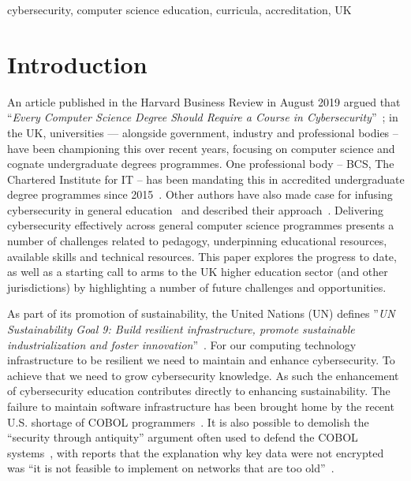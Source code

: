 \documentclass[conference]{IEEEtran}
\begin{document}
\begin{IEEEkeywords}
cybersecurity, computer science education, curricula, accreditation, UK
\end{IEEEkeywords}

\section{Introduction}\label{sec:intro}
An article published in the Harvard Business Review in August 2019 argued that ``{\emph{Every Computer Science Degree Should Require a Course in Cybersecurity}}''~\cite{cable_2019}; in the UK, universities
--- alongside government, industry and professional bodies -- have been championing this over recent years, focusing on computer science and cognate undergraduate degrees programmes. One professional body -- BCS, The Chartered Institute for IT -- has been mandating this in accredited undergraduate degree programmes since 2015~\cite{Cricketal2019,itnowcyber:2019,itnowaccred:2020}. Other authors have also made case for infusing cybersecurity in general education~\cite{Sobiesk2015} and described their approach~\cite{Blair2020}.  Delivering cybersecurity effectively across general computer science programmes presents a number of challenges related to pedagogy, underpinning educational resources, available skills and technical resources. This paper explores the progress to date, as well as a starting call to arms to the UK higher education sector (and other jurisdictions) by highlighting a number of future challenges and opportunities.

As part of its promotion of sustainability, the United Nations (UN)
defines ''{\em{UN Sustainability Goal 9: Build resilient
    infrastructure, promote sustainable industrialization and foster
    innovation}}''~\cite{UNgoal9}. For our computing technology
infrastructure to be resilient we need to maintain and enhance
cybersecurity. To achieve that we need to grow cybersecurity
knowledge. As such the enhancement of cybersecurity education
contributes directly to enhancing sustainability. The failure to
maintain software infrastructure has been brought home by the recent
U.S. shortage of COBOL programmers~\cite{Shein2020e}.  It is also
possible to demolish the ``security through antiquity'' argument often used to defend the COBOL systems~\cite{PangTanriverdi2017a}, with reports that the explanation why key data were not encrypted was ``it is not feasible to implement on networks that are too old''~\cite{Sternstein2015a}.
\end{document}
